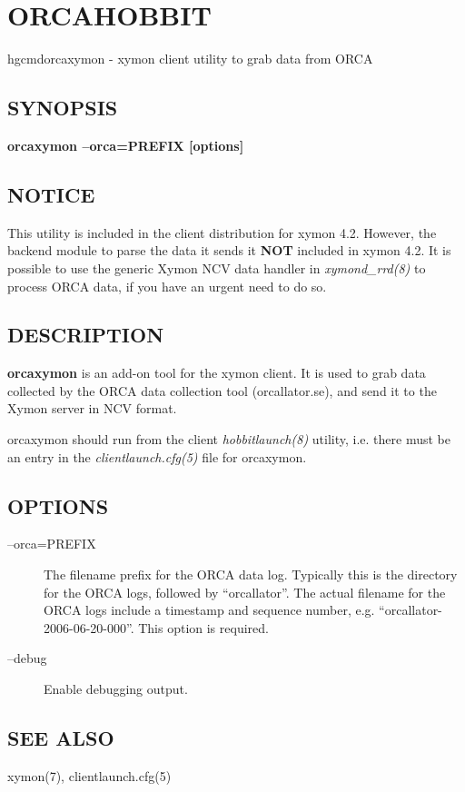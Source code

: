  
  

%


\newpage
\section{ORCAHOBBIT}

hgcmd{orcaxymon} - xymon client utility to grab data from ORCA

 \subsection{SYNOPSIS}
\textbf{orcaxymon --orca=PREFIX [options]}


 
\subsection{NOTICE}
 This utility is included in the client distribution for xymon 4.2. However, the backend module to parse the data it sends it \textbf{NOT}
 included in xymon 4.2. It is possible to use the generic Xymon NCV data handler in \emph{xymond\_rrd(8)}
 to process ORCA data, if you have an urgent need to do so. 

 
\subsection{DESCRIPTION}
\textbf{orcaxymon}
 is an add-on tool for the xymon client. It is used to grab data collected by the ORCA data collection tool (orcallator.se), and send it to the Xymon server in NCV format. 

  orcaxymon should run from the client \emph{hobbitlaunch(8)}
 utility, i.e. there must be an entry in the \emph{clientlaunch.cfg(5)}
 file for orcaxymon. 


 
\subsection{OPTIONS}
\begin{description}
\item[--orca=PREFIX] The filename prefix for the ORCA data log. Typically this is the directory for the ORCA logs, followed by ``orcallator''. The actual filename for the ORCA logs include a timestamp and sequence number, e.g. ``orcallator-2006-06-20-000''. This option is required. 

 

\item[--debug] Enable debugging output. 

 


\end{description}
\subsection{SEE ALSO}
xymon(7), clientlaunch.cfg(5) 

 


  

